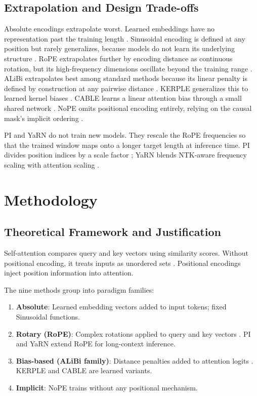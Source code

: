 \documentclass[conference]{IEEEtran}
\begin{document}
\subsection{Extrapolation and Design Trade-offs}

Absolute encodings extrapolate worst. Learned embeddings have no representation past the training length \cite{devlin2019,radford2019,press2022}. Sinusoidal encoding is defined at any position but rarely generalizes, because models do not learn its underlying structure \cite{vaswani2017,press2022}. RoPE extrapolates further by encoding distance as continuous rotation, but its high-frequency dimensions oscillate beyond the training range \cite{su2024roformer,chen2023}. ALiBi extrapolates best among standard methods because its linear penalty is defined by construction at any pairwise distance \cite{press2022}. KERPLE generalizes this to learned kernel biases \cite{kerple2022}. CABLE learns a linear attention bias through a small shared network \cite{cable2023}. NoPE omits positional encoding entirely, relying on the causal mask's implicit ordering \cite{kazemnejad2023}.

PI and YaRN do not train new models. They rescale the RoPE frequencies so that the trained window maps onto a longer target length at inference time. PI divides position indices by a scale factor \cite{chen2023}; YaRN blends NTK-aware frequency scaling with attention scaling \cite{peng2023yarn}.

\section{Methodology}
\label{sec:methodology}

\subsection{Theoretical Framework and Justification}

Self-attention compares query and key vectors using similarity scores. Without positional encoding, it treats inputs as unordered sets \cite{vaswani2017}. Positional encodings inject position information into attention.

The nine methods group into paradigm families:
\begin{enumerate}
\item \textbf{Absolute}: Learned embedding vectors added to input tokens; fixed Sinusoidal functions.
\item \textbf{Rotary (RoPE)}: Complex rotations applied to query and key vectors \cite{su2024roformer}. PI and YaRN extend RoPE for long-context inference.
\item \textbf{Bias-based (ALiBi family)}: Distance penalties added to attention logits \cite{press2022}. KERPLE and CABLE are learned variants.
\item \textbf{Implicit}: NoPE trains without any positional mechanism.
\end{enumerate}
\end{document}
